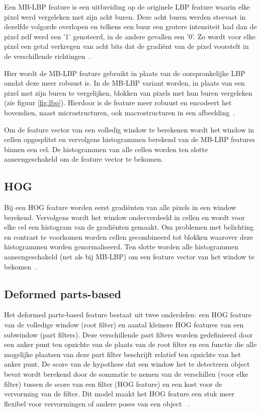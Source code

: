 Een MB-LBP feature is een uitbreiding op de originele LBP feature waarin elke pixel werd vergeleken met zijn acht buren. Deze acht buren werden steevast in dezelfde volgorde overlopen en telkens een buur een grotere intensiteit had dan de pixel zelf werd een '1' genoteerd, in de andere gevallen een '0'. Zo wordt voor elke pixel een getal verkregen van acht bits dat de gradi\"ent van de pixel voorstelt in de verschillende richtingen~\cite{ojala1996comparative}.

Hier wordt de MB-LBP feature gebruikt in plaats van de oorspronkelijke LBP omdat deze meer robuust is. In de MB-LBP variant worden, in plaats van een pixel met zijn buren te vergelijken, blokken van pixels met hun buren vergeleken (zie figuur \ref{fig:lbp}). Hierdoor is de feature meer robuust en encodeert het bovendien, naast microstructuren, ook macrostructuren in een afbeelding~\cite{liao2007learning}. 

Om de feature vector van een volledig window te berekenen wordt het window in cellen opgesplitst en vervolgens histogrammen berekend van de MB-LBP features binnen een cel. De histogrammen van alle cellen worden ten slotte aaneengeschakeld om de feature vector te bekomen.

\subsection{HOG} \label{sec:feat_hog}

Bij een HOG feature worden eerst gradi\"enten van alle pixels in een window berekend. Vervolgens wordt het window onderverdeeld in cellen en wordt voor elke cel een histogram van de gradi\"enten gemaakt. Om problemen met belichting en contrast te voorkomen worden cellen gecombineerd tot blokken waarover deze histogrammen worden genormaliseerd. Ten slotte worden alle histogrammen aaneengeschakeld (net als bij MB-LBP) om een feature vector van het window te bekomen~\cite{dalal2005histograms}.

\subsection{Deformed parts-based} \label{sec:feat_part}
Het deformed parts-based feature bestaat uit twee onderdelen: een HOG feature van de volledige window (root filter) en aantal kleinere HOG features van een subwindow (part filters). Deze verschillende part filters worden gedefinieerd door een anker punt ten opzichte van de plaats van de root filter en een functie die alle mogelijke plaatsen van deze part filter beschrijft relatief ten opzichte van het anker punt. De score van de hypothese dat een window het te detecteren object bevat wordt berekend door de sommatie te nemen van de verschillen (voor elke filter) tussen de score van een filter (HOG feature) en een kost voor de vervorming van de filter. Dit model maakt het HOG feature een stuk meer flexibel voor vervormingen of andere poses van een object ~\cite{felzenszwalb2010object}.

